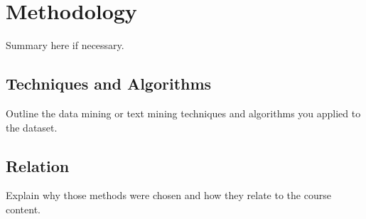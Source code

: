 \chapter{Methodology}
\label{ch:method}

Summary here if necessary.

\section{Techniques and Algorithms}
Outline the data mining or text mining techniques and algorithms you applied to the dataset.

\section{Relation}
Explain why those methods were chosen and how they relate to the course content.